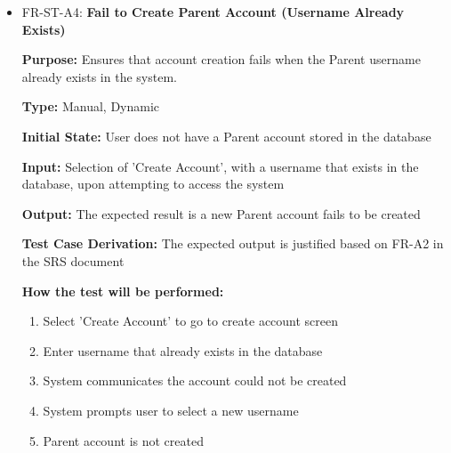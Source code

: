 \documentclass[12pt, titlepage]{article}
\begin{document}
\begin{itemize}
  \item FR-ST-A4: \textbf{Fail to Create Parent Account (Username Already Exists)}
  \begin{mdframed}[linewidth=0.5mm]
      \textbf{Purpose:} Ensures that account creation fails when the Parent username already exists in the system. \par
      \textbf{Type:} Manual, Dynamic \par
      \textbf{Initial State:} User does not have a Parent account stored in the database \par
      \textbf{Input:} Selection of 'Create Account', with a username that exists in the database, upon attempting to access the system \par
      \textbf{Output:} The expected result is a new Parent account fails to be created \par
      \textbf{Test Case Derivation:} The expected output is justified based on FR-A2 in the SRS document \par
      \textbf{How the test will be performed:}
      \begin{enumerate}[noitemsep]
        \item Select 'Create Account' to go to create account screen
        \item Enter username that already exists in the database
        \item System communicates the account could not be created
        \item System prompts user to select a new username
        \item Parent account is not created
      \end{enumerate}
  \end{mdframed}


\end{itemize}
\end{document}
